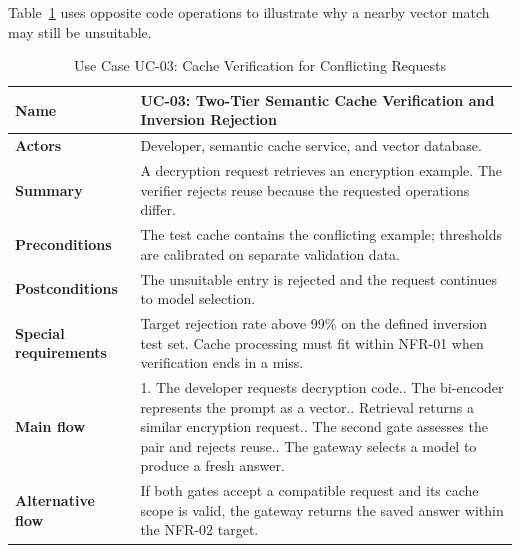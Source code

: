 Table~\ref{tab:uc03} uses opposite code operations to illustrate why a nearby vector match may still be unsuitable.
\begin{table}[H]
\centering\small
\caption{Use Case UC-03: Cache Verification for Conflicting Requests}
\label{tab:uc03}
\renewcommand{\arraystretch}{1.08}
\begin{tabularx}{\textwidth}{|p{3.1cm}|X|}
\hline
\textbf{Name} & UC-03: Two-Tier Semantic Cache Verification and Inversion Rejection \\ \hline
\textbf{Actors} & Developer, semantic cache service, and vector database. \\ \hline
\textbf{Summary} & A decryption request retrieves an encryption example. The verifier rejects reuse because the requested operations differ. \\ \hline
\textbf{Preconditions} & The test cache contains the conflicting example; thresholds are calibrated on separate validation data. \\ \hline
\textbf{Postconditions} & The unsuitable entry is rejected and the request continues to model selection. \\ \hline
\textbf{Special requirements} & Target rejection rate above 99\% on the defined inversion test set. Cache processing must fit within NFR-01 when verification ends in a miss. \\ \hline
\textbf{Main flow} & 1. The developer requests decryption code.\newline 2. The bi-encoder represents the prompt as a vector.\newline 3. Retrieval returns a similar encryption request.\newline 4. The second gate assesses the pair and rejects reuse.\newline 5. The gateway selects a model to produce a fresh answer. \\ \hline
\textbf{Alternative flow} & If both gates accept a compatible request and its cache scope is valid, the gateway returns the saved answer within the NFR-02 target. \\ \hline
\end{tabularx}
\end{table}

